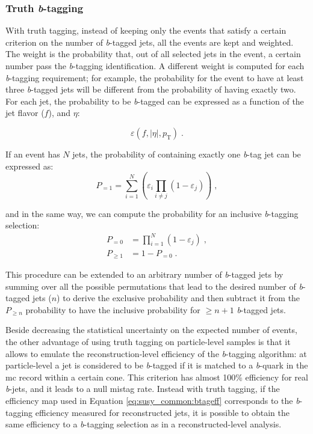 \subsubsection*{Truth \textit{b}-tagging}

With truth tagging, instead of keeping only the events that satisfy a certain criterion on the number of \textit{b}-tagged jets, all the events are kept and weighted. The weight is the probability that, out of all selected jets in the event,
a certain number pass the \textit{b}-tagging identification.
A different weight is computed for each \textit{b}-tagging requirement; 
for example, the probability for the event to have at least three \textit{b}-tagged jets will be different from the probability of having exactly two. 
For each jet, the probability to be \textit{b}-tagged can be expressed as a function of the jet flavor ($f$), \pt and $\eta$:

\begin{equation}
\varepsilon \left(f,|\eta|,p_{\mathrm{T}}\right) \; . 
\label{eq:susy_common:btageff}
\end{equation}

\noindent If an event has $N$ jets, the probability of containing exactly one \textit{b}-tag jet can be expressed as:
\begin{equation}
        P_{=1} = \sum\limits_{i=1}^N \left( \varepsilon_{i} \prod\limits_{i \neq j} \left( 1 - \varepsilon_{j} \right) \right) \; , \nonumber
\end{equation}

\noindent and in the same way, we can compute the probability for an inclusive \textit{b}-tagging selection:
\begin{equation}
 \begin{split}
        P_{=0} &= \prod\limits_{i=1}^N \left( 1 - \varepsilon_{j} \right) \; ,\\
        P_{\geq 1} &= 1 - P_{=0} \; . \nonumber
 \end{split}
\end{equation} 
 
\noindent This procedure can be extended to an arbitrary number of \textit{b}-tagged jets by summing over all the possible permutations that lead to the desired number of \textit{b}-tagged jets ($n$) to derive the exclusive probability and then subtract it from the $P_{\geq n}$ probability to have the inclusive probability for $\geq n+1$ \textit{b}-tagged jets.
 
Beside decreasing the statistical uncertainty on the expected number of events, the other advantage of using truth tagging on particle-level samples is that it allows to emulate the reconstruction-level efficiency of the \textit{b}-tagging algorithm: 
at particle-level a jet is considered to be \textit{b}-tagged if it is matched to a \textit{b}-quark in the \gls{mc} record within a certain cone. This criterion has 
almost 100\% efficiency for real \textit{b}-jets, and it leads to a null mistag rate. Instead with truth tagging, if the efficiency map used in Equation \ref{eq:susy_common:btageff} corresponds to the \textit{b}-tagging efficiency measured for reconstructed jets, 
it is possible to obtain the same efficiency to a \textit{b}-tagging selection as in a reconstructed-level analysis. 

